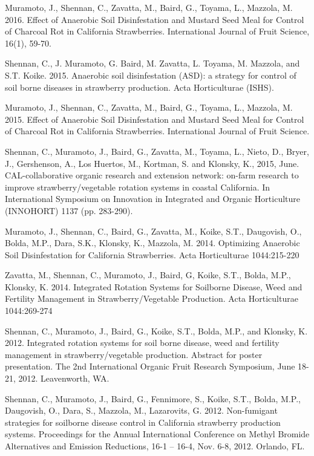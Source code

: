 \documentclass{res}
\begin{document}
\begin{resume}
		Muramoto, J., Shennan, C., Zavatta, M., Baird, G., Toyama, L.,  Mazzola, M. 2016. Effect of Anaerobic Soil Disinfestation and Mustard Seed Meal for Control of Charcoal Rot in California Strawberries. International Journal of Fruit Science, 16(1), 59-70.
		
		Shennan, C., J. Muramoto, G. Baird, M. Zavatta, L. Toyama, M. Mazzola, and S.T. Koike. 2015. Anaerobic soil disinfestation (ASD): a strategy for control of soil borne diseases in strawberry production. Acta Horticulturae (ISHS).
		
		Muramoto, J., Shennan, C., Zavatta, M., Baird, G., Toyama, L., Mazzola, M. 2015. Effect of Anaerobic Soil Disinfestation and Mustard Seed Meal for Control of Charcoal Rot in California Strawberries. International Journal of Fruit Science.
		
		Shennan, C., Muramoto, J., Baird, G., Zavatta, M., Toyama, L., Nieto, D., Bryer, J., Gershenson, A., Los Huertos, M., Kortman, S. and Klonsky, K., 2015, June. CAL-collaborative organic research and extension network: on-farm research to improve strawberry/vegetable rotation systems in coastal California. In International Symposium on Innovation in Integrated and Organic Horticulture (INNOHORT) 1137 (pp. 283-290).
		
		Muramoto, J., Shennan, C., Baird, G., Zavatta, M., Koike, S.T., Daugovish, O., Bolda, M.P., Dara, S.K., Klonsky, K., Mazzola, M. 2014. Optimizing Anaerobic Soil Disinfestation for California Strawberries. Acta Horticulturae 1044:215-220
		
		Zavatta, M., Shennan, C., Muramoto, J., Baird, G, Koike, S.T., Bolda, M.P., Klonsky, K. 2014. Integrated Rotation Systems for Soilborne Disease, Weed and Fertility Management in Strawberry/Vegetable Production. Acta Horticulturae 1044:269-274
		
		Shennan, C., Muramoto, J., Baird, G., Koike, S.T., Bolda, M.P., and Klonsky, K. 2012. Integrated rotation systems for soil borne disease, weed and fertility management in strawberry/vegetable production. Abstract for poster presentation. The 2nd International Organic Fruit Research Symposium, June 18-21, 2012. Leavenworth, WA.
		
		Shennan, C., Muramoto, J., Baird, G., Fennimore, S., Koike, S.T., Bolda, M.P., Daugovish, O., Dara, S., Mazzola, M., Lazarovits, G. 2012. Non-fumigant strategies for soilborne disease control in California strawberry production systems. Proceedings for the Annual International Conference on Methyl Bromide Alternatives and Emission Reductions, 16-1 – 16-4, Nov. 6-8, 2012. Orlando, FL.
		

\end{resume}
\end{document}
